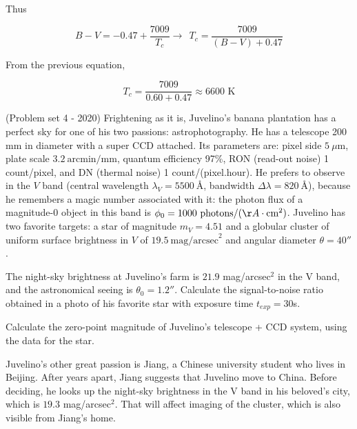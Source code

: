 \documentclass[11pt]{article}
\begin{document}
\begin{pproblem}
\begin{pssolution*}{}{}
\begin{alternativas}
        Thus

        \[B-V = -0.47 + \frac{7009}{T_c} \rightarrow \ \ \boxed{T_c = \frac{7009}{(B-V) + 0.47}}\]

        \item From the previous equation,
        
        \[\boxed{T_c = \frac{7009}{0.60 + 0.47} \approx 6600 \text{ K}}\]
    \end{alternativas}    

\end{pssolution*}
\end{pproblem}


\begin{pproblem}
    (Problem set 4 - 2020) Frightening as it is, Juvelino's banana plantation has a perfect sky for one of his two passions: astrophotography. He has a telescope 200 mm in diameter with a super CCD attached. Its parameters are: pixel side \(5\ \mu\text{m}\), plate scale \(3.2\ \text{arcmin/mm}\), quantum efficiency 97\%, RON (read-out noise) 1 count/pixel, and DN (thermal noise) 1 count/(pixel.hour). He prefers to observe in the \(V\) band (central wavelength \(\lambda_V = 5500\ \text{Å}\), bandwidth \(\Delta \lambda = 820\ \text{Å}\)), because he remembers a magic number associated with it: the photon flux of a magnitude-0 object in this band is \(\phi_0 = 1000\ \text{photons/}(\AA\cdot \text{cm}^2)\). Juvelino has two favorite targets: a star of magnitude \(m_V = 4.51\) and a globular cluster of uniform surface brightness in \(V\) of \(19.5\ \text{mag/arcsec}^2\) and angular diameter \(\theta = 40''\).

    \begin{alternativas}
        \item The night-sky brightness at Juvelino's farm is \(21.9\) mag/arcsec\(^2\) in the V band, and the astronomical seeing is \(\theta_0=1.2''\). Calculate the signal-to-noise ratio obtained in a photo of his favorite star with exposure time \(t_{exp}=30\)s.
        \item Calculate the zero-point magnitude of Juvelino's telescope + CCD system, using the data for the star.
        
        Juvelino's other great passion is Jiang, a Chinese university student who lives in Beijing. After years apart, Jiang suggests that Juvelino move to China. Before deciding, he looks up the night-sky brightness in the V band in his beloved's city, which is \(19.3\) mag/arcsec\(^2\). That will affect imaging of the cluster, which is also visible from Jiang's home.


\end{alternativas}
\end{pproblem}
\end{document}
